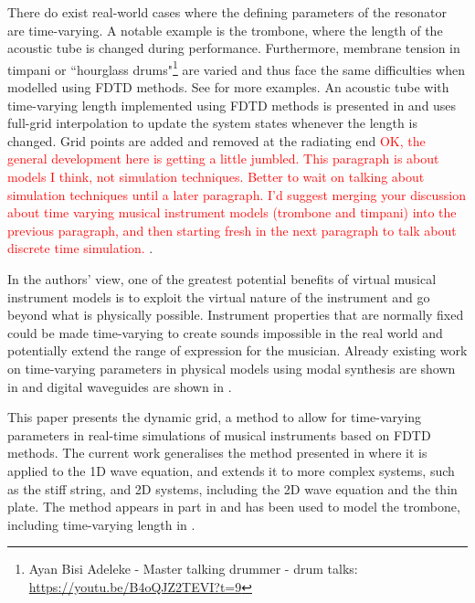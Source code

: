 \documentclass[fleqn]{jaes}
\def\SBcomment[#1]{\textcolor{red}{#1}}
\begin{document}
There do exist real-world cases where the defining parameters of the resonator are time-varying.
A notable example is the trombone, where the length of the acoustic tube is changed during performance. Furthermore, membrane tension in timpani or ``hourglass drums"\footnote{Ayan Bisi Adeleke - Master talking drummer - drum talks: \url{https://youtu.be/B4oQJZ2TEVI?t=9}} are varied and thus face the same difficulties when modelled using FDTD methods. See \cite[Sec. 12.4]{Willemsen2021Thesis} for more examples. An acoustic tube with time-varying length implemented using FDTD methods is presented in \cite{Hofmann2019} and uses full-grid interpolation to update the system states whenever the length is changed. Grid points are added and removed at the radiating end \SBcomment[OK, the general development here is getting a little jumbled. This paragraph is about models I think, not simulation techniques. Better to wait on talking about simulation techniques until a later paragraph. I'd suggest merging your discussion about time varying musical instrument models (trombone and timpani) into the previous paragraph, and then starting fresh in the next paragraph to talk about discrete time simulation. ].

In the authors' view, one of the greatest potential benefits of virtual musical instrument models is to exploit the virtual nature of the instrument and go beyond what is physically possible. Instrument properties that are normally fixed could be made time-varying to create sounds impossible in the real world and potentially extend the range of expression for the musician. Already existing work on time-varying parameters in physical models using modal synthesis \cite{morrison1993mosaic} are shown in \cite{Mehes2016, Willemsen2017} and digital waveguides \cite{Smith1992} are shown in \cite{Michon2014}.


This paper presents the dynamic grid, a method to allow for time-varying parameters in real-time simulations of musical instruments based on FDTD methods. The current work generalises the method presented in \cite{Willemsen2021a} where it is applied to the 1D wave equation, and extends it to more complex systems, such as the stiff string, and 2D systems, including the 2D wave equation and the thin plate. The method appears in part in \cite[Ch. 12]{Willemsen2021Thesis} and has been used to model the trombone, including time-varying length in \cite{Willemsen2021b}. 
\end{document}
